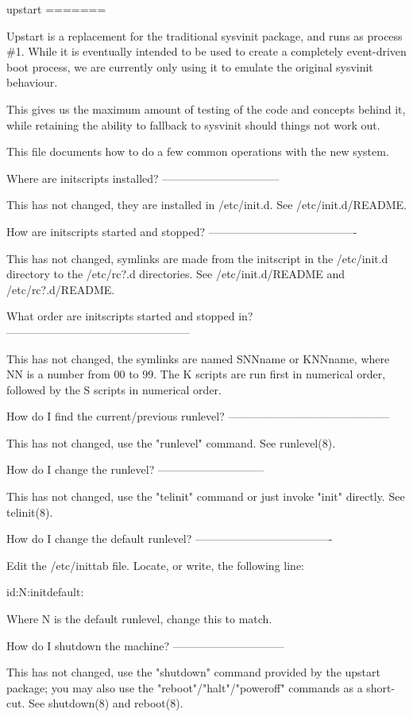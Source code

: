\documentclass[mingoth,a4paper]{jsarticle}
\begin{document}
{{{{{{{upstart
=======

Upstart is a replacement for the traditional sysvinit package, and
runs as process \#1.  While it is eventually intended to be used to
create a completely event-driven boot process, we are currently
only using it to emulate the original sysvinit behaviour.

This gives us the maximum amount of testing of the code and concepts
behind it, while retaining the ability to fallback to sysvinit should
things not work out.

This file documents how to do a few common operations with the new
system.


Where are initscripts installed?
--------------------------------

This has not changed, they are installed in /etc/init.d.  See
/etc/init.d/README.


How are initscripts started and stopped?
----------------------------------------

This has not changed, symlinks are made from the initscript in the
/etc/init.d directory to the /etc/rc?.d directories.  See
/etc/init.d/README and /etc/rc?.d/README.


What order are initscripts started and stopped in?
--------------------------------------------------

This has not changed, the symlinks are named SNNname or KNNname, where
NN is a number from 00 to 99.  The K scripts are run first in
numerical order, followed by the S scripts in numerical order.


How do I find the current/previous runlevel?
--------------------------------------------

This has not changed, use the "runlevel" command.  See runlevel(8).


How do I change the runlevel?
-----------------------------

This has not changed, use the "telinit" command or just invoke "init"
directly.  See telinit(8).


How do I change the default runlevel?
-------------------------------------

Edit the /etc/inittab file.  Locate, or write, the following line:

    id:N:initdefault:

Where N is the default runlevel, change this to match.


How do I shutdown the machine?
------------------------------

This has not changed, use the "shutdown" command provided by the
upstart package; you may also use the "reboot"/"halt"/"poweroff"
commands as a short-cut.  See shutdown(8) and reboot(8).

}}}}}}}
\end{document}
